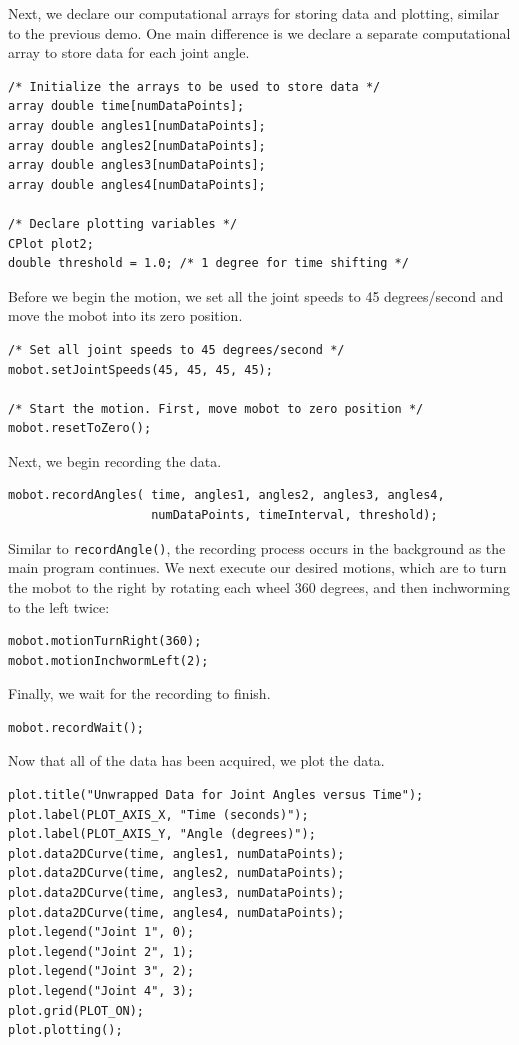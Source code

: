 \documentclass{article}
\begin{document}
Next, we declare our computational arrays for storing data and plotting, similar to 
the previous demo. One main difference is we declare a separate computational array
to store data for each joint angle.
\begin{verbatim}
/* Initialize the arrays to be used to store data */
array double time[numDataPoints];
array double angles1[numDataPoints];
array double angles2[numDataPoints];
array double angles3[numDataPoints];
array double angles4[numDataPoints];

/* Declare plotting variables */
CPlot plot2;
double threshold = 1.0; /* 1 degree for time shifting */
\end{verbatim}

Before we begin the motion, we set all the joint speeds to 45 degrees/second
and move the mobot into its zero position.
\begin{verbatim}
/* Set all joint speeds to 45 degrees/second */
mobot.setJointSpeeds(45, 45, 45, 45);

/* Start the motion. First, move mobot to zero position */
mobot.resetToZero();
\end{verbatim}

Next, we begin recording the data.
\begin{verbatim}
mobot.recordAngles( time, angles1, angles2, angles3, angles4, 
                    numDataPoints, timeInterval, threshold);
\end{verbatim}

Similar to \texttt{recordAngle()}, the recording process occurs in the background as
the main program continues. We next execute our desired motions, which are to turn the
mobot to the right by rotating each wheel 360 degrees, and then inchworming to
the left twice:
\begin{verbatim}
mobot.motionTurnRight(360);
mobot.motionInchwormLeft(2);
\end{verbatim}

Finally, we wait for the recording to finish.
\begin{verbatim}
mobot.recordWait();
\end{verbatim}

Now that all of the data has been acquired, we plot the data.
\begin{verbatim}
plot.title("Unwrapped Data for Joint Angles versus Time");
plot.label(PLOT_AXIS_X, "Time (seconds)");
plot.label(PLOT_AXIS_Y, "Angle (degrees)");
plot.data2DCurve(time, angles1, numDataPoints);
plot.data2DCurve(time, angles2, numDataPoints);
plot.data2DCurve(time, angles3, numDataPoints);
plot.data2DCurve(time, angles4, numDataPoints);
plot.legend("Joint 1", 0);
plot.legend("Joint 2", 1);
plot.legend("Joint 3", 2);
plot.legend("Joint 4", 3);
plot.grid(PLOT_ON);
plot.plotting();
\end{verbatim}
\end{document}
